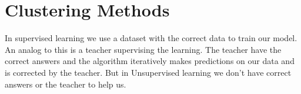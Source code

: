 \chapter{Clustering Methods} \label{ch:clusteringMethods}
In supervised learning we use a dataset with the correct data to train our model. An analog to this is
a teacher supervising the learning. The teacher have the correct answers and the algorithm iteratively makes predictions on our data and is corrected by the teacher. But in Unsupervised learning we don't have correct answers or the teacher to help us.



